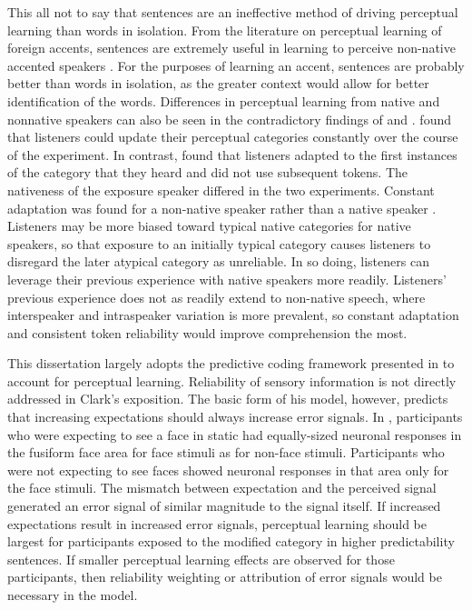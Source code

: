 This all not to say that sentences are an ineffective method of driving perceptual learning than words in isolation.
From the literature on perceptual learning of foreign accents, sentences are extremely useful in learning to perceive non-native accented speakers \citep{Bradlow2008}.
For the purposes of learning an accent, sentences are probably better than words in isolation, as the greater context would allow for better identification of the words.
Differences in perceptual learning from native and nonnative speakers can also be seen in the contradictory findings of \citet{Sumner2011} and \citet{Kraljic2008}.
\citet{Sumner2011} found that listeners could update their perceptual categories constantly over the course of the experiment.
In contrast, \citet{Kraljic2008} found that listeners adapted to the first instances of the category that they heard and did not use subsequent tokens.
The nativeness of the exposure speaker differed in the two experiments.
Constant adaptation was found for a non-native speaker \citep{Sumner2011} rather than a native speaker \citep{Kraljic2008}.
Listeners may be more biased toward typical native categories for native speakers, so that exposure to an initially typical category causes listeners to disregard the later atypical category as unreliable.
In so doing, listeners can leverage their previous experience with native speakers more readily.
Listeners' previous experience does not as readily extend to non-native speech, where interspeaker and intraspeaker variation is more prevalent, so constant adaptation and consistent token reliability would improve comprehension the most.

This dissertation largely adopts the predictive coding framework presented in \citet{Clark2013} to account for perceptual learning.
Reliability of sensory information is not directly addressed in Clark's exposition.
The basic form of his model, however, predicts that increasing expectations should always increase error signals.
In \citet[cited in \citet{Clark2013}]{Egner2010}, participants who were expecting to see a face in static had equally-sized neuronal responses in the fusiform face area for face stimuli as for non-face stimuli.  
Participants who were not expecting to see faces showed neuronal responses in that area only for the face stimuli.
The mismatch between expectation and the perceived signal generated an error signal of similar magnitude to the signal itself.
If increased expectations result in increased error signals, perceptual learning should be largest for participants exposed to the modified category in higher predictability sentences.
If smaller perceptual learning effects are observed for those participants, then reliability weighting or attribution of error signals would be necessary in the model.


